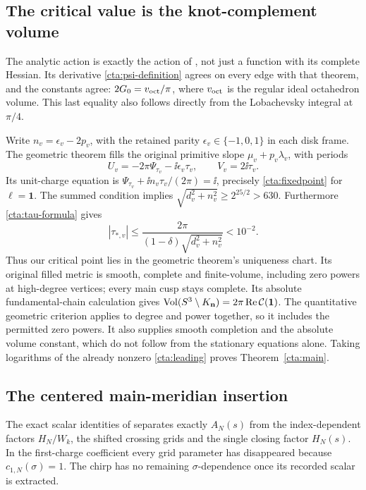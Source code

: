 \subsection{The critical value is the knot-complement volume}
The analytic action is exactly the action of
\cite[Theorem~1.1]{Geometry}, not just a function with its
complete Hessian. Its derivative \eqref{cta:psi-definition}
agrees on every edge with that theorem, and the constants agree:
\(2G_0=v_{\rm oct}/\pi\), where \(v_{\rm oct}\) is the regular
ideal octahedron volume. This last equality also follows directly
from the Lobachevsky integral at \(\pi/4\).

Write \(n_v=\epsilon_v-2p_v\), with the retained parity
\(\epsilon_v\in\{-1,0,1\}\) in each disk frame.
The geometric theorem fills the original primitive slope
\(\mu_v+p_v\lambda_v\), with periods
\[
 U_v=-2\pi\Psi_{\tau_v}-\ii\epsilon_v\tau_v,\qquad
 V_v=2\ii\tau_v.
\]
Its unit-charge equation is
\(\Psi_{\tau_v}+\ii n_v\tau_v/(2\pi)=\ii\), precisely
\eqref{cta:fixedpoint} for \(\boldsymbol\ell=\mathbf1\).
The summed condition implies
\(\sqrt{d_v^2+n_v^2}\ge2^{25/2}>630\).
Furthermore \eqref{cta:tau-formula} gives
\[
 |\tau_{*,v}|\le
 \frac{2\pi}{(1-\delta)\sqrt{d_v^2+n_v^2}}<10^{-2}.
\]
Thus our critical point lies in the geometric theorem's
uniqueness chart. Its original filled metric is smooth,
complete and finite-volume, including zero powers at high-degree
vertices; every main cusp stays complete. Its absolute
fundamental-chain calculation gives
\(\operatorname{Vol}(S^3\setminus K_{\mathbf n})=2\pi\operatorname{Re}\mathcal C(\mathbf1)\).
The quantitative geometric criterion applies to degree and power
together, so it includes the permitted zero powers. It also supplies
smooth completion and the absolute volume constant, which do not
follow from the stationary equations alone.
Taking logarithms of the already nonzero
\eqref{cta:leading} proves Theorem~\ref{cta:main}.

\subsection{The centered main-meridian insertion}
The exact scalar identities of \cite[Proposition~8.1]{Meridian}
separates exactly \(A_N(s)\) from the index-dependent factors
\(H_N/W_k\), the shifted crossing grids and the single closing
factor \(H_N(s)\). In the first-charge coefficient every grid
parameter has disappeared because \(c_{1,N}(\sigma)=1\).
The chirp has no remaining \(\sigma\)-dependence once its
recorded scalar is extracted.

